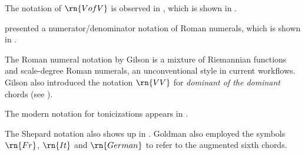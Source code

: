 The notation of $\rn{V of V}$ is observed in
\textcite{mokrejs1913lessons}, which is shown in
.


\textcite{gilson1919traite} presented a
numerator/denominator notation of Roman numerals, which is
shown in .



The Roman numeral notation by Gilson is a mixture of
Riemannian functions and scale-degree Roman numerals, an
unconventional style in current workflows. Gilson also
introduced the notation $\rn{VV}$ for \emph{dominant of the
dominant} chords (see
).


The modern notation for tonicizations appears in
\textcite{tischler1964practical}.

The Shepard notation also shows up in
\textcite{goldman1965harmony}. Goldman also employed the
symbols $\rn{Fr}$, $\rn{It}$ and $\rn{German}$ to refer to
the augmented sixth chords.
